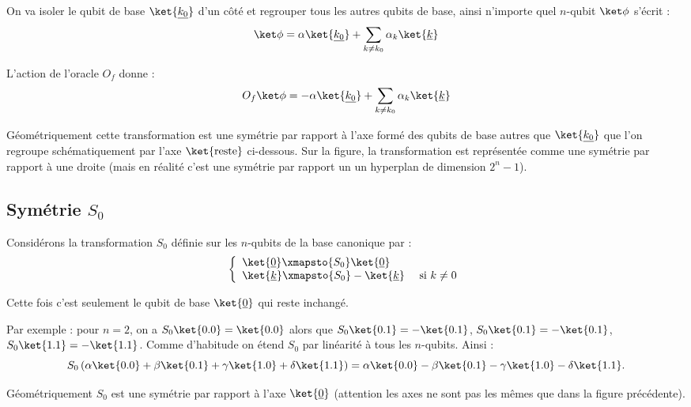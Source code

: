 \documentclass[11pt,class=report,crop=false]{standalone}
\begin{document}
On va isoler le qubit de base $\ket{\underline{k_0}}$ d'un côté et regrouper tous les autres qubits de base, ainsi n'importe quel $n$-qubit $\ket\phi$ s'écrit :
$$\ket\phi = \alpha \ket{\underline{k_0}} + \sum_{k\neq k_0} \alpha_k \ket{\underline{k}}$$

L'action de l'oracle $O_f$ donne :
$$O_f \ket\phi = -\alpha \ket{\underline{k_0}} + \sum_{k\neq k_0} \alpha_k \ket{\underline{k}}$$

Géométriquement cette transformation est une symétrie par rapport à l'axe formé des qubits de base autres que $\ket{\underline{k_0}}$ que l'on regroupe schématiquement par l'axe $\ket{\text{reste}}$ ci-dessous. Sur la figure, la transformation est représentée comme une symétrie par rapport à une droite (mais en réalité c'est une symétrie par rapport un un hyperplan de dimension $2^n-1$).



\subsection{Symétrie $S_0$}

Considérons la transformation $S_0$ définie sur les $n$-qubits de la base canonique par :
$$\left\{
\begin{array}{l}
\ket{\underline{0}} \xmapsto{S_0} \ket{\underline{0}} \\
\ket{\underline{k}} \xmapsto{S_0} -\ket{\underline{k}} \quad \text{ si } k\neq 0 \\
\end{array}
\right.$$

Cette fois c'est seulement le qubit de base $\ket{\underline{0}}$ qui reste inchangé.


Par exemple : pour $n=2$, on a $S_0 \ket{0.0} = \ket{0.0}$ alors que $S_0 \ket{0.1} = -\ket{0.1}$, $S_0 \ket{0.1} = -\ket{0.1}$, $S_0 \ket{1.1} = -\ket{1.1}$. Comme d'habitude on étend $S_0$ par linéarité à tous les $n$-qubits.
Ainsi :
$$S_0 \left( \alpha\ket{0.0} + \beta\ket{0.1} + \gamma\ket{1.0} + \delta\ket{1.1} \right) =	
\alpha\ket{0.0} - \beta\ket{0.1} - \gamma\ket{1.0} - \delta\ket{1.1}.$$

Géométriquement $S_0$ est une symétrie par rapport à l'axe $\ket{\underline0}$ (attention les axes ne sont pas les mêmes que dans la figure précédente).

\end{document}
